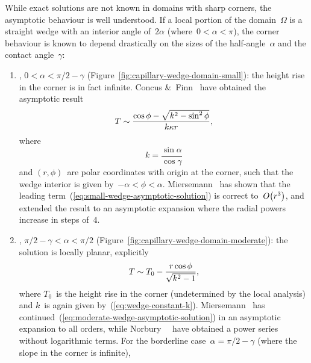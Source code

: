 While exact solutions are not known in domains with sharp corners,
the asymptotic behaviour is well understood.
If a local portion of the domain~$\Omega$
is a straight wedge with an interior angle of~$2 \alpha$
(where~$0 < \alpha < \pi$),
the corner behaviour is known to depend drastically
on the sizes of the half-angle~$\alpha$ and the contact angle~$\gamma$:
\begin{enumerate}
  \item
    , $0 < \alpha < \pi/2 - \gamma$
    (Figure~\ref{fig:capillary-wedge-domain-small}):
    the height rise in the corner is in fact infinite.
    Concus \&~Finn~\cite{concus-1970-class-capillary-surfaces}
    have obtained the asymptotic result
    \begin{equation}
      T \sim \frac{\cos\phi - \sqrt{k^2 - \sin^2 \phi}}{k \kappa r},
      \label{eq:small-wedge-asymptotic-solution}
    \end{equation}
    where
    \begin{equation}
      k = \frac{\sin\alpha}{\cos\gamma}
      \label{eq:wedge-constant-k}
    \end{equation}
    and $(r, \phi)$~are polar coordinates with origin at the corner,
    such that the wedge interior is given by~$-\alpha < \phi < \alpha$.
    Miersemann~\cite{miersemann-1993-asymptotic-corner-capillary-singular}
    has shown that the leading term~(\ref{eq:small-wedge-asymptotic-solution})
    is correct to~$\order \roundbr*{r^3}$,
    and extended the result to an asymptotic expansion
    where the radial powers increase in steps of~$4$.
  \item
    , $\pi/2 - \gamma < \alpha < \pi/2$
    (Figure~\ref{fig:capillary-wedge-domain-moderate}):
    the solution is locally planar,
    explicitly
    \begin{equation}
      T \sim T_0 - \frac{r \cos\phi}{\sqrt{k^2 - 1}},
      \label{eq:moderate-wedge-asymptotic-solution}
    \end{equation}
    where $T_0$~is the height rise in the corner
    (undetermined by the local analysis)
    and $k$~is again given by~(\ref{eq:wedge-constant-k}).
    Miersemann~\cite{miersemann-1988-asymptotic-expansion-corner-capillary}
    has continued~(\ref{eq:moderate-wedge-asymptotic-solution})
    in an asymptotic expansion to all orders,
    while Norbury~\etal~\cite{norbury-2005-corner-solutions-laplace-young}
    have obtained a power series without logarithmic terms.
    For the borderline case~$\alpha = \pi/2 - \gamma$
    (where the slope in the corner is infinite),

\end{enumerate}
